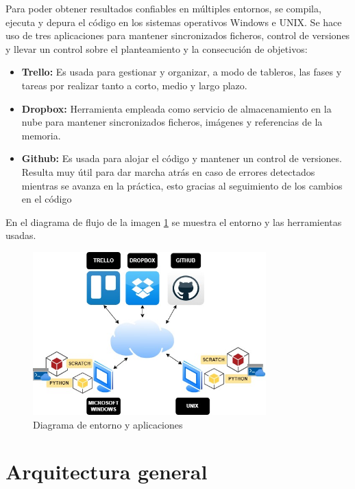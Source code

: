 \documentclass[a4paper, 12pt]{book}
\begin{document}
Para poder obtener resultados confiables en múltiples entornos, se compila, ejecuta y depura el código en los sistemas operativos Windows e UNIX. Se hace uso de tres aplicaciones para mantener sincronizados ficheros, control de versiones y llevar un control sobre el planteamiento y la consecución de objetivos:

\begin{itemize}
  \item \textbf{Trello:} Es usada para gestionar y organizar, a modo de tableros, las fases y tareas por realizar tanto a corto, medio y largo plazo. 
  \item \textbf{Dropbox:} Herramienta empleada como servicio de almacenamiento en la nube para mantener sincronizados ficheros, imágenes y referencias de la memoria.
  \item \textbf{Github:} Es usada para alojar el código y mantener un control de versiones. Resulta muy útil para dar marcha atrás en caso de errores detectados mientras se avanza en la práctica, esto gracias al seguimiento de los cambios en el código
\end{itemize}

En el diagrama de flujo de la imagen \ref{fig:diagrama_trabajo} se muestra el entorno y las herramientas usadas.

 \begin{figure}[!h]
    \centering
    \includegraphics[width=9cm, keepaspectratio]{img/workplace.jpg}
    \caption{Diagrama de entorno y aplicaciones}
    \label{fig:diagrama_trabajo}
 \end{figure}

\section{Arquitectura general} 
\label{sec:arquitectura}

\end{document}
